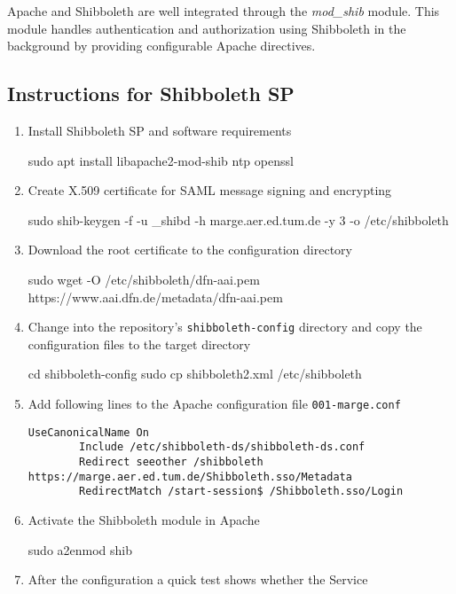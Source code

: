 Apache and Shibboleth are well integrated through the \textit{mod\_shib} module.
This module handles authentication and authorization using Shibboleth in the
background by providing configurable Apache directives.

\subsection{Instructions for Shibboleth SP}

\begin{enumerate}
    \item Install Shibboleth SP and software requirements
    \begin{terminal}
        sudo apt install libapache2-mod-shib ntp openssl
    \end{terminal}
    \item Create X.509 certificate for SAML message signing and encrypting
    \begin{terminal}
        sudo shib-keygen -f -u _shibd -h marge.aer.ed.tum.de -y 3 -o /etc/shibboleth
    \end{terminal}
    \item Download the root certificate to the configuration directory
    \begin{terminal}
        sudo wget -O /etc/shibboleth/dfn-aai.pem https://www.aai.dfn.de/metadata/dfn-aai.pem
    \end{terminal}
    \item Change into the repository's \texttt{shibboleth-config} directory and
    copy the configuration files to the target directory
    \begin{terminal}
        cd shibboleth-config
        sudo cp shibboleth2.xml /etc/shibboleth
    \end{terminal}
    \item Add following lines to the Apache configuration file
    \texttt{001-marge.conf}
    \begin{lstlisting}[frame={l}]
        UseCanonicalName On
        Include /etc/shibboleth-ds/shibboleth-ds.conf
        Redirect seeother /shibboleth https://marge.aer.ed.tum.de/Shibboleth.sso/Metadata
        RedirectMatch /start-session$ /Shibboleth.sso/Login
    \end{lstlisting}
    \item Activate the Shibboleth module in Apache
    \begin{terminal}
        sudo a2enmod shib
    \end{terminal}
    \item After the configuration a quick test shows whether the Service

\end{enumerate}
